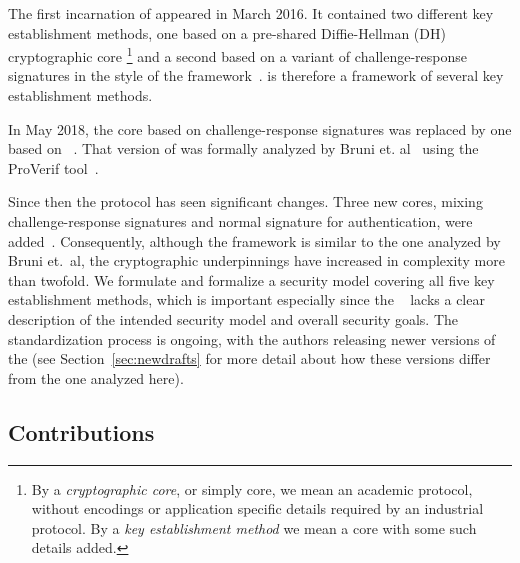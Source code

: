 \documentclass[runningheads, envcountsame, hidelinks, a4paper, draft, x11names]{llncs}
\begin{document}
%
The first incarnation of \mEdhoc{} appeared in March 2016.
%
It contained two different key establishment methods, one based on a
pre-shared Diffie-Hellman (DH) cryptographic core
\footnote{By a \emph{cryptographic core}, or simply core, we mean an academic protocol,
without encodings or application specific details required by an industrial
protocol.
%
By a \emph{key establishment method} we mean a core with some such details added.
}
and a second based on a
variant of challenge-response signatures in the style of the \mNoise{}
framework~\cite{perrin2016noise}.
%
\mEdhoc{} is therefore a framework of several key establishment methods.
%

In May 2018, the core based on challenge-response signatures was replaced by
one based on \mSigma{}~\cite{bruni-analysis-selander-ace-cose-ecdhe-08}.
%
That version of \mEdhoc{} was formally analyzed by Bruni et.
al~\cite{DBLP:conf/secsr/BruniJPS18} using the ProVerif
tool~\cite{DBLP:conf/csfw/Blanchet01}.
%

Since then the protocol has seen significant changes.
%
Three new cores, mixing challenge-response signatures and normal signature for
authentication, were added~\cite{our-analysis-selander-lake-edhoc-01}.
%
Consequently, although the framework is similar to the one analyzed by Bruni
et.~al, the cryptographic underpinnings have increased in complexity more than
twofold.
%
We formulate and formalize a security model covering all five key
establishment methods, which is important especially since the
\mSpec{}~\cite{our-analysis-selander-lake-edhoc-01} lacks a clear description
of the intended security model and
overall security goals.
%
The standardization process is ongoing, with the authors releasing newer versions of the \mSpec{} (see Section~\ref{sec:newdrafts} for more detail about how these versions differ from the one analyzed here).
%

%

\subsection{Contributions}
\label{sec:contributions}
\end{document}
